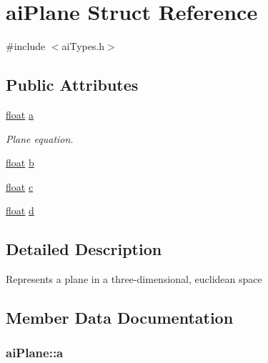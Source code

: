 \hypertarget{structai_plane}{\section{ai\-Plane Struct Reference}
\label{structai_plane}
}


{\ttfamily \#include $<$ai\-Types.\-h$>$}

\subsection*{Public Attributes}
\begin{DoxyCompactItemize}
\item 
\hyperlink{fmod_8h_aeb841aa4b4b5f444b5d739d865b420af}{float} \hyperlink{structai_plane_aeadf64e70e6daf1f7f431c90cfc8bce1}{a}
\begin{DoxyCompactList}\small\item\em Plane equation. \end{DoxyCompactList}\item 
\hyperlink{fmod_8h_aeb841aa4b4b5f444b5d739d865b420af}{float} \hyperlink{structai_plane_a84ab33cd9b2f5325282b489f8a2bf11c}{b}
\item 
\hyperlink{fmod_8h_aeb841aa4b4b5f444b5d739d865b420af}{float} \hyperlink{structai_plane_a7b0ea36c355ca003a5789088fb24da1f}{c}
\item 
\hyperlink{fmod_8h_aeb841aa4b4b5f444b5d739d865b420af}{float} \hyperlink{structai_plane_ab8696b583b6fab46ae30cd5b691e7c9a}{d}
\end{DoxyCompactItemize}


\subsection{Detailed Description}
Represents a plane in a three-\/dimensional, euclidean space 

\subsection{Member Data Documentation}
\hypertarget{structai_plane_aeadf64e70e6daf1f7f431c90cfc8bce1}{
\subsubsection[{a}]{ ai\-Plane\-::a}}\label{structai_plane_aeadf64e70e6daf1f7f431c90cfc8bce1}


